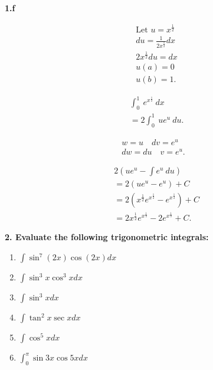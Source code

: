 \documentclass{report}
\begin{document}
    \pagebreak \bigbreak \noindent 
    \textbf{1.f}
    \bigbreak \noindent 
    \begin{minipage}[t]{0.47\textwidth}
        \begin{align*}
            &\text{Let $u=x^{\frac{1}{2}}$} \\
            &du= \frac{1}{2x^{\frac{1}{2}}}dx \\
            &2x^{\frac{1}{2}}du = dx \\
            &u(a) = 0 \\
            &u(b) = 1
        .\end{align*}    
    \end{minipage}
    \begin{minipage}[t]{0.47\textwidth}
        \begin{align*}
            &\int_{0}^{1}\ e^{x^{\frac{1}{2}}}\ dx \\
            &=2\int_{0}^{1}\ ue^{u}\ du 
        .\end{align*}
    \end{minipage}
    \bigbreak \noindent 
    \begin{minipage}[t]{0.47\textwidth}
        \begin{align*}
            w = u \quad dv = e^{u} \\
            dw = du \quad v = e^{u}
        .\end{align*}
    \end{minipage}
    \begin{minipage}[t]{0.47\textwidth}
        \begin{align*}
            &2\left(ue^{u} - \int e^{u}\ du\right) \\
            &=2\left(ue^{u} - e^{u}\right) + C \\
            &=2\left(x^{\frac{1}{2}}e^{x^{\frac{1}{2}}} - e^{x^{\frac{1}{2}}}\right) + C \\
            &=2x^{\frac{1}{2}}e^{x^{\frac{1}{2}}} - 2e^{x^{\frac{1}{2}}} + C
        .\end{align*}
    \end{minipage}


    \pagebreak \bigbreak \noindent 
    \begin{mdframed}
        \textbf{2. Evaluate the following trigonometric integrals:}
        \begin{enumerate}[label=(\alph*)]
            \item $\int \sin ^7(2 x) \cos (2 x) d x$
            \item $\int \sin ^3 x \cos ^3 x d x$
            \item $\int \sin ^3 x d x$
            \item $\int \tan ^2 x \sec x d x$
            \item $\int \cos ^5 x d x$
            \item $\int_0^\pi \sin 3 x \cos 5 x d x$
        \end{enumerate}

    \end{mdframed}
\end{document}
